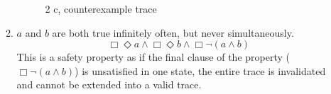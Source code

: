 \documentclass{article}
\begin{document}
\begin{enumerate}
\begin{enumerate}[label=(\alph*)]
                \begin{figure}[htpb]
                    \centering
                    \caption{2 c, counterexample trace}%
                    \label{fig:2c}
                \end{figure}
            \item $a$ and $b$ are both true infinitely often, but never simultaneously.
                \begin{equation}
                    \Box \Diamond a \wedge \Box\Diamond b \wedge \Box\neg(a \wedge b)
                \end{equation}
                This is a safety property as if the final clause of the property ($\Box \neg(a\wedge b)$) is unsatisfied in one state, the entire trace is invalidated and cannot be extended into a valid trace.


\end{enumerate}
\end{enumerate}
\end{document}
